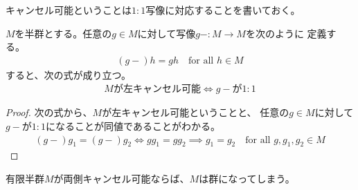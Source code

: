 	キャンセル可能ということは$1:1$写像に対応することを書いておく。

	\begin{proposition}[キャンセル可能と1:1写像]
	\label{prop:キャンセル可能と1:1写像} %
		$M$を半群とする。任意の$g\in M$に対して写像$g-:M\to M$を次のように
		定義する。
		\begin{equation*}\begin{split}
			(g-)h = gh \quad\text{for all }h\in M
		\end{split}\end{equation*}
		すると、次の式が成り立つ。
		\begin{equation*}\begin{split}
			\text{$M$が左キャンセル可能} \iff \text{$g-$が$1:1$}
		\end{split}\end{equation*}
	\end{proposition} %
	\begin{proof} 次の式から、$M$が左キャンセル可能ということと、
	任意の$g\in M$に対して$g-$が$1:1$になることが同値であることがわかる。
	\begin{equation*}\begin{split}
		(g-)g_1 = (g-)g_2 \iff gg_1 = gg_2 \implies g_1 = g_2
		\quad\text{for all }g,g_1,g_2\in M
	\end{split}\end{equation*}
	\end{proof}

	有限半群$M$が両側キャンセル可能ならば、$M$は群になってしまう。

